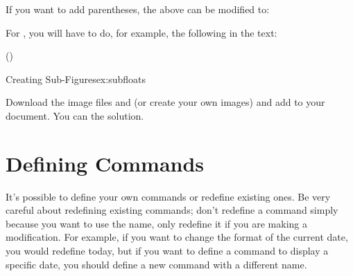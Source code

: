 If you want to add parentheses, the above can be modified
to:
\begin{code}
\newline
{}\newline
{}
\end{code}
For , you will have to do, for example, the following
in the text:
\begin{codeS}
()
\end{codeS}

\begin{exercise}{Creating Sub-Figures}{ex:subfloats}

Download the image files 
and 
 (or create your own images) and 
add  to your document.  You can
 the solution.
\end{exercise}


\chapter{Defining Commands}
\label{ch:newcom}

It's possible to define your own \glspl{command} or
redefine existing ones.  Be very careful about redefining existing
commands; don't redefine a command simply because you want to use the
name, only redefine it if you are making a modification.  For
example, if you want to change the format of the current date, you
would redefine \gls{today}, but if you want to define a command
to display a specific date, you should define a new command with a
different name.

